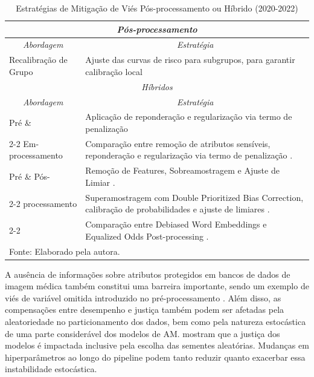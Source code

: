 \newpage

\begin{longtable}{p{3cm}|p{11cm}}%
\caption{Estratégias de Mitigação de Viés Pós-processamento ou Híbrido (2020-2022)} \label{tab:mitigacao_pos} \\
\hline
\multicolumn{2}{c}{\textit{Pós-processamento}} \\ \hline
\multicolumn{1}{c|}{\textit{Abordagem}} & \multicolumn{1}{c}{\textit{Estratégia}} %
\\ \hline
Recalibração de Grupo &
Ajuste das curvas de risco para subgrupos, para garantir calibração local \cite{foryciarz2022evaluating} \\ \hline

\multicolumn{2}{c}{\textit{Híbridos}} \\
\hline
\multicolumn{1}{c|}{\textit{Abordagem}} & \multicolumn{1}{c}{\textit{Estratégia}} %
\\ \hline
Pré \newline \& & Aplicação de reponderação e regularização via termo de penalização \cite{mosteiro2022bias} \\
\cline{2-2}
Em-processamento & Comparação entre remoção de atributos sensíveis, reponderação e regularização via termo de penalização \cite{park2021comparison}. \\
\hline
Pré \newline \& Pós- & Remoção de Features, Sobreamostragem e Ajuste de Limiar \cite{yuan2021assessing}. \\
\cline{2-2}
processamento & Superamostragem com Double Prioritized Bias Correction, calibração de probabilidades e ajuste de limiares \cite{afrose2022subpopulation}. \\
\cline{2-2}
& Comparação entre Debiased Word Embeddings e Equalized Odds Post-processing \cite{chen2020exploring}. \\
\hline
\multicolumn{2}{l}{\small Fonte: Elaborado pela autora.} \\ %
\end{longtable}

A ausência de informações sobre atributos protegidos em bancos de dados de imagem médica também constitui uma barreira importante,  sendo um exemplo de viés de variável omitida introduzido no pré-processamento \cite{beheshtian2022generalizability,larrazabal2020gender,seyyed2020chexclusion}. Além disso, as compensações entre desempenho e justiça também podem ser afetadas pela aleatoriedade no particionamento dos dados, bem como pela natureza estocástica de uma parte considerável dos modelos de AM. \citet{amir2021impact} mostram que a justiça dos modelos é impactada inclusive pela escolha das sementes aleatórias. Mudanças em hiperparâmetros ao longo do pipeline podem tanto reduzir quanto exacerbar essa instabilidade estocástica.

